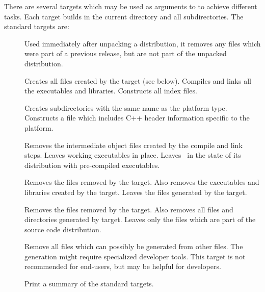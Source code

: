 There are several targets which may be used as arguments to
 to achieve different tasks.
Each target builds in the current directory
and all subdirectories.  The standard targets are:
\begin{description}
\item[]
Used immediately after unpacking a distribution, it removes
any files which were part of a previous release, but are not
part of the unpacked distribution.
\item[]
Creates all files created by the  target (see below).
Compiles and links all the executables and libraries.
Constructs all index files.
\item[]
Creates subdirectories with the same name as the platform type.
Constructs a  file which includes C++ header information
specific to the platform.
\item[]
Removes the intermediate object files created by the compile and
link steps.  Leaves working executables in place.  Leaves
\OOMMF\ in the state of its distribution with pre-compiled
executables.
\item[]
Removes the files removed by the  target.
Also removes the executables and libraries created by the 
target.  Leaves the files generated by the  target.
\item[]
Removes the files removed by the  target.
Also removes all files and directories generated by
 target.  Leaves only the files which
are part of the source code distribution.
\item[]
Remove all files which can possibly be generated from other files.
The generation might require specialized developer tools.  This
target is not recommended for end-users, but may be helpful for
developers.
\item[]
Print a summary of the standard targets.
\end{description}

